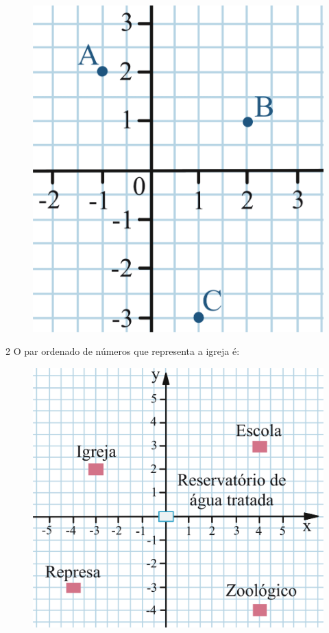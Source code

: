 \begin{figure}[htpb!]
\centering
\includegraphics[width=\textwidth]{./ilustras-mat/modulo_10-atividade_1.png}
\end{figure}

\begin{emptybox}
\end{emptybox}

\pagebreak
\num{2} O par ordenado de números que representa a igreja é:

\begin{figure}[htpb!]
\centering
\includegraphics[width=\textwidth]{./ilustras-mat/modulo_10-atividade_2.png}
\end{figure}

